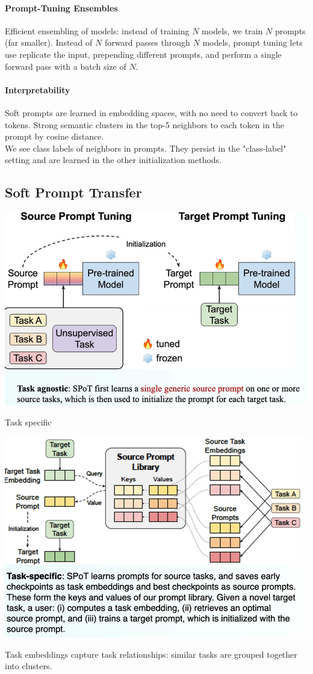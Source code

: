 \documentclass[10pt]{report}
\begin{document}
\paragraph{Prompt-Tuning Ensembles} Efficient ensembling of models: instead of training $N$ models, we train $N$ prompts (far smaller). Instead of $N$ forward passes through $N$ models, prompt tuning lets use replicate the input, prepending different prompts, and perform a single forward pass with a batch size of $N$.
\paragraph{Interpretability} Soft prompts are learned in embedding spaces, with no need to convert back to tokens. Strong semantic clusters in the top-5 neighbors to each token in the prompt by cosine distance.\\
We see class labels of neighbors in prompts. They persist in the "class-label" setting and are learned in the other initialization methods.
\subsection{Soft Prompt Transfer}
\begin{center}
	\includegraphics[scale=0.5]{91.png}
\end{center}
Task specific
\begin{center}
	\includegraphics[scale=0.5]{92.png}
\end{center}
Task embeddings capture task relationships: similar tasks are grouped together into clusters.
\end{document}
